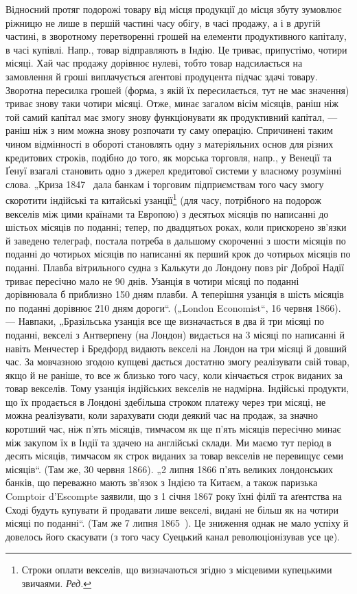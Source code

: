 Відносний протяг подорожі товару від місця продукції до місця
збуту зумовлює ріжницю не лише в першій частині часу обігу, в часі
продажу, а і в другій частині, в зворотному перетворенні грошей
на елементи продуктивного капіталу, в часі купівлі. Напр., товар відправляють
в Індію. Це триває, припустімо, чотири місяці. Хай час продажу
дорівнює нулеві, тобто товар надсилається на замовлення й гроші
виплачується аґентові продуцента підчас здачі товару. Зворотна пересилка
грошей (форма, з якій їх пересилається, тут не має значення) триває
знову таки чотири місяці. Отже, минає загалом вісім місяців, раніш
ніж той самий капітал має змогу знову функціонувати як продуктивний капітал,
— раніш ніж з ним можна знову розпочати ту саму операцію.
Спричинені таким чином відмінності в обороті становлять одну з матеріяльних
основ для різних кредитових строків, подібно до того, як
морська торговля, напр., у Венеції та Ґенуї взагалі становить одно з
джерел кредитової системи у власному розумінні слова. „Криза 1847~
дала банкам і торговим підприємствам того часу змогу скоротити індійські
та китайські узанції\footnote*{
Строки оплати векселів, що визначаються згідно з місцевими
купецькими звичаями. \emph{Ред.}
} (для часу, потрібного на подорож векселів
між цими країнами та Европою) з десятьох місяців по написанні до
шістьох місяців по поданні; тепер, по двадцятьох роках, коли прискорено
зв’язки й заведено телеграф, постала потреба в дальшому скороченні
з шости місяців по поданні до чотирьох місяців по написанні як
перший крок до чотирьох місяців по поданні. Плавба вітрильного судна
з Калькути до Лондону повз ріг Доброї Надії триває пересічно мало
не 90 днів. Узанція в чотири місяці по поданні дорівнювала б приблизно
150 дням плавби. А теперішня узанція в шість місяців по поданні
дорівнює 210 дням дороги“. („London Economist“, 16 червня 1866). —
Навпаки, „Бразільська узанція все ще визначається в два й три місяці
по поданні, векселі з Антверпену (на Лондон) видається на 3 місяці по
написанні й навіть Менчестер і Бредфорд видають векселі на Лондон на
три місяці й довший час. За мовчазною згодою купцеві дається достатню
змогу реалізувати свій товар, якщо й не раніше, то все ж
близько того часу, коли кінчається строк виданих за товар векселів.
Тому узанція індійських векселів не надмірна. Індійські продукти, що
їх продається в Лондоні здебільша строком платежу через три місяці,
не можна реалізувати, коли зарахувати сюди деякий час на продаж, за
значно коротший час, ніж п’ять місяців, тимчасом як ще п’ять місяців
пересічно минає між закупом їх в Індії та здачею на англійські склади.
Ми маємо тут період в десять місяців, тимчасом як строк виданих за
товар векселів не перевищує семи місяців“. (Там же, 30 червня 1866).
„2 липня 1866 п’ять великих лондонських банків, що переважно мають
зв’язок з Індією та Китаєм, а також паризька Comptoir d’Escompte заявили,
що з 1 січня 1867 року їхні філії та аґентства на Сході будуть
купувати й продавати лише векселі, видані не більш як на чотири місяці
по поданні“. (Там же 7 липня 1865~). Це зниження однак не мало
успіху й довелось його скасувати (з того часу Суецький канал революціонізував
усе це).


